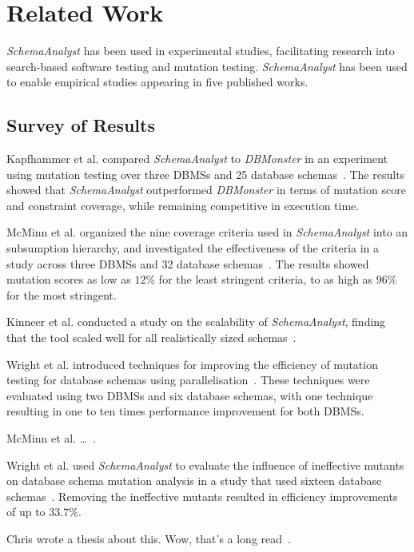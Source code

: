 \section{Related Work}
\textit{SchemaAnalyst} has been used in experimental studies, facilitating research into
search-based software testing and mutation testing.  \textit{SchemaAnalyst} has been used to enable
empirical studies appearing in five published works. 
\subsection{Survey of Results}

Kapfhammer et al. compared \textit{SchemaAnalyst} to \textit{DBMonster}
in an experiment using mutation testing over three DBMSs and 25 database 
schemas~\cite{kapfhammer2013search}. The results showed that \textit{SchemaAnalyst} outperformed
\textit{DBMonster} in terms of mutation score and constraint coverage, while remaining competitive
in execution time.

McMinn et al. organized the nine coverage criteria used in \textit{SchemaAnalyst} into an subsumption
hierarchy, and investigated the effectiveness of the criteria in a study across
three DBMSs and 32 database schemas~\cite{mcminn2015effectiveness}.  The results showed mutation
scores as low as $12\%$ for the least stringent criteria, to as high as $96\%$ for the most stringent.

Kinneer et al. conducted a study on the scalability of \textit{SchemaAnalyst}, finding that the tool
scaled well for all realistically sized schemas~\cite{kinneer2015automatically}.

Wright et al. introduced techniques for improving the efficiency of mutation testing for database
schemas using parallelisation~\cite{wright2013efficient}. These techniques were evaluated using two
DBMSs and six database schemas, with one technique resulting in one to ten times performance
improvement for both DBMSs.

McMinn et al. \dots~\cite{mcminn2016virtual}.

Wright et al. used \textit{SchemaAnalyst} to evaluate the influence of ineffective mutants on
database schema mutation analysis in a study that used sixteen database
schemas~\cite{wright2014impact}. Removing the ineffective mutants resulted in efficiency
improvements of up to $33.7\%$.

Chris wrote a thesis about this. Wow, that's a long read~\cite{wright2015mutation}.

